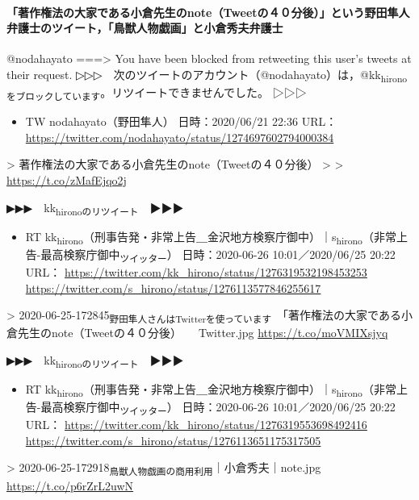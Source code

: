 \documentclass[]{ltjarticle}
\let\oldparagraph\paragraph
\renewcommand{\paragraph}[1]{\oldparagraph{#1}\mbox{}}
\begin{document}
\paragraph{「著作権法の大家である小倉先生のnote（Tweetの４０分後）」という野田隼人弁護士のツイート，「鳥獣人物戯画」と小倉秀夫弁護士}
\label{sec:org5a74891}

@nodahayato ===> You have been blocked from retweeting this user's tweets at their request.  
▷▷▷　次のツイートのアカウント（@nodahayato）は，@kk\textsubscript{hironoをブロックしています}。リツイートできませんでした。 ▷▷▷  

\begin{itemize}
\item TW nodahayato（野田隼人） 日時：2020/06/21 22:36 URL： \url{https://twitter.com/nodahayato/status/1274697602794000384}
\end{itemize}

> 著作権法の大家である小倉先生のnote（Tweetの４０分後）  
>   
> \url{https://t.co/zMafEjqo2j}  

▶▶▶　kk\textsubscript{hironoのリツイート}　▶▶▶  

\begin{itemize}
\item RT kk\textsubscript{hirono}（刑事告発・非常上告＿金沢地方検察庁御中）｜s\textsubscript{hirono}（非常上告-最高検察庁御中\textsubscript{ツイッター}） 日時：2020-06-26 10:01／2020/06/25 20:22 URL： \url{https://twitter.com/kk\_hirono/status/1276319532198453253} \url{https://twitter.com/s\_hirono/status/1276113577846255617}
\end{itemize}

> 2020-06-25-172845\textsubscript{野田隼人さんはTwitterを使っています}　「著作権法の大家である小倉先生のnote（Tweetの４０分後）　　Twitter.jpg \url{https://t.co/moVMIXsjyq}  

▶▶▶　kk\textsubscript{hironoのリツイート}　▶▶▶  

\begin{itemize}
\item RT kk\textsubscript{hirono}（刑事告発・非常上告＿金沢地方検察庁御中）｜s\textsubscript{hirono}（非常上告-最高検察庁御中\textsubscript{ツイッター}） 日時：2020-06-26 10:01／2020/06/25 20:22 URL： \url{https://twitter.com/kk\_hirono/status/1276319553698492416} \url{https://twitter.com/s\_hirono/status/1276113651175317505}
\end{itemize}

> 2020-06-25-172918\textsubscript{鳥獣人物戯画の商用利用}｜小倉秀夫｜note.jpg \url{https://t.co/p6rZrL2uwN}  
\end{document}
